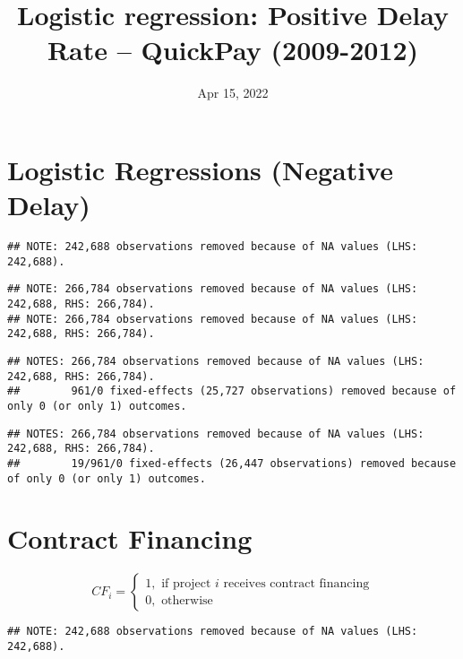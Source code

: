 \documentclass[
]{article}
\title{Logistic regression: Positive Delay Rate -- QuickPay (2009-2012)}
\author{}
\date{\vspace{-2.5em}Apr 15, 2022}
\begin{document}
\maketitle

\hypertarget{logistic-regressions-negative-delay}{%
\section{Logistic Regressions (Negative
Delay)}\label{logistic-regressions-negative-delay}}

\begin{verbatim}
## NOTE: 242,688 observations removed because of NA values (LHS: 242,688).
\end{verbatim}

\begin{verbatim}
## NOTE: 266,784 observations removed because of NA values (LHS: 242,688, RHS: 266,784).
## NOTE: 266,784 observations removed because of NA values (LHS: 242,688, RHS: 266,784).
\end{verbatim}

\begin{verbatim}
## NOTES: 266,784 observations removed because of NA values (LHS: 242,688, RHS: 266,784).
##        961/0 fixed-effects (25,727 observations) removed because of only 0 (or only 1) outcomes.
\end{verbatim}

\begin{verbatim}
## NOTES: 266,784 observations removed because of NA values (LHS: 242,688, RHS: 266,784).
##        19/961/0 fixed-effects (26,447 observations) removed because of only 0 (or only 1) outcomes.
\end{verbatim}

\hypertarget{contract-financing}{%
\section{Contract Financing}\label{contract-financing}}

\[ CF_i = \begin{cases} 1, \text{ if project } i \text{ receives contract financing}\\
0, \text{ otherwise} \end{cases}\]

\begin{verbatim}
## NOTE: 242,688 observations removed because of NA values (LHS: 242,688).
\end{verbatim}
\end{document}
